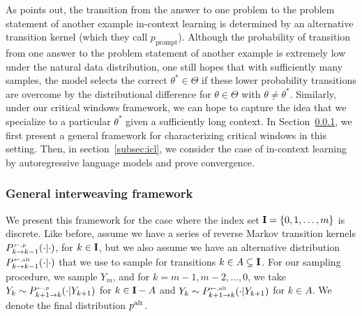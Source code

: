 As \cite{xie2022explanationincontextlearningimplicit} points out, the transition from the answer to one problem to the problem statement of another example in-context learning is determined by an alternative transition kernel (which they call $p_{\textrm{prompt}}$). Although the probability of transition from one answer to the problem statement of another example is extremely low under the natural data distribution, one still hopes that with sufficiently many samples, the model selects the correct $\theta^* \in \Theta$ if these lower probability transitions are overcome by the distributional difference for $\theta \in \Theta$ with $\theta \ne \theta^*$. Similarly, under our critical windows framework, we can hope to capture the idea that we specialize to a particular $\theta^*$ given a sufficiently long context. In Section~\ref{subsec:gen_interweaving}, we first present a general framework for characterizing critical windows in this setting. Then, in section~\ref{subsec:icl}, we consider the case of in-context learning by autoregressive language models and prove convergence. 

\subsubsection{General interweaving framework}\label{subsec:gen_interweaving}
\noindent We  present this framework for the case where the index set $\mathbf{I}=\{0,1,\dots,m\}$ is discrete. Like before, assume we have a series of reverse Markov transition kernels $\kernelreverse[p]_{k \to k-1} (\cdot|\cdot)$, for $k \in\mathbf{I}$, but we also assume we have an alternative distribution $\kernelreverse[\alt]_{k \to k-1}(\cdot |\cdot)$ that we use to sample for transitions $k \in A \subsetneq \mathbf{I}$. For our sampling procedure, we sample $Y_m$, and for $k=m-1,m-2,\dots,0$, we take $Y_{k}\sim \kernelreverse[p]_{k+1\to k} (\cdot|Y_{k+1})$ for $k \in \mathbf{I}-A$ and $Y_{k}\sim \kernelreverse[\alt]_{k+1\to k} (\cdot|Y_{k+1})$ for $k \in A$. We denote the final distribution $p^{\mathrm{alt}}$. \\

